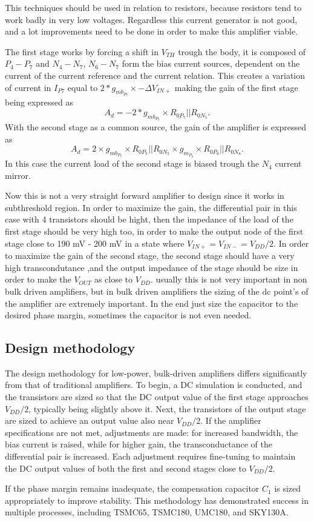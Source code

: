 \documentclass[12pt]{article}
\begin{document}
This techniques should be used in relation to resistors, because resistors tend to work badly in very low voltages. Regardless this current generator is not good, and a lot improvements need to be done in order to make this amplifier viable.

The first stage works by forcing a shift in $V_{TH}$ trough the body, it is composed of  $P_4-P_7$ and $N_4-N_7$, $N_6-N_7$ form the bias current sources, dependent on the current of the current reference and the current relation.
This creates a variation of current in  $I_{P7}$ equal to $2*g_{mb_{P_{7}}} \times -\Delta V_{IN+}$ making the gain of the first stage being expressed as 
\begin{equation}
    A_d= -2*g_{mb_{P_{7}}} \times R_{0P_7}|| R_{0N_5}.
\end{equation}
With the second stage as a common source, the gain of the amplifier is expressed as
\begin{equation}
    A_d= 2 \times g_{mb_{P_{7}}} \times R_{0P_7}|| R_{0N_5} \times  g_{m_{P_8}} \times R_{0P_8}|| R_{0N_8}.
\end{equation}
In this case the current load of the second stage is biased trough the $N_4$ current mirror.

Now this is not a very straight forward amplifier to design since it works in subthreshold region.
In order to maximize the gain, the differential pair in this case with 4 transistors should be hight, then the impedance of the load of the first stage should be very high too, in order to make the output node of the first stage close to 190 mV - 200 mV in a state where $V_{IN+} = V_{IN-} = V_{DD}/2$. In order to maximize the gain of the second stage, the second stage should have a very high transcondutance ,and the output impedance of the stage should be size in order to make the $V_{OUT}$ as close to $V_{DD}$. usually this is not very important in non bulk driven amplifiers, but in bulk driven amplifiers the sizing of the dc point's of the amplifier are extremely important. In the end just size the capacitor to the desired phase margin, sometimes the capacitor is not even needed.

\subsection{Design methodology}

The design methodology for low-power, bulk-driven amplifiers differs significantly from that of traditional amplifiers. To begin, a DC simulation is conducted, and the transistors are sized so that the DC output value of the first stage approaches \( V_{DD}/2 \), typically being slightly above it. Next, the transistors of the output stage are sized to achieve an output value also near \( V_{DD}/2 \). If the amplifier specifications are not met, adjustments are made: for increased bandwidth, the bias current is raised, while for higher gain, the transconductance of the differential pair is increased. Each adjustment requires fine-tuning to maintain the DC output values of both the first and second stages close to \( V_{DD}/2 \).

If the phase margin remains inadequate, the compensation capacitor \( C_1 \) is sized appropriately to improve stability. This methodology has demonstrated success in multiple processes, including TSMC65, TSMC180, UMC180, and SKY130A.
\end{document}

